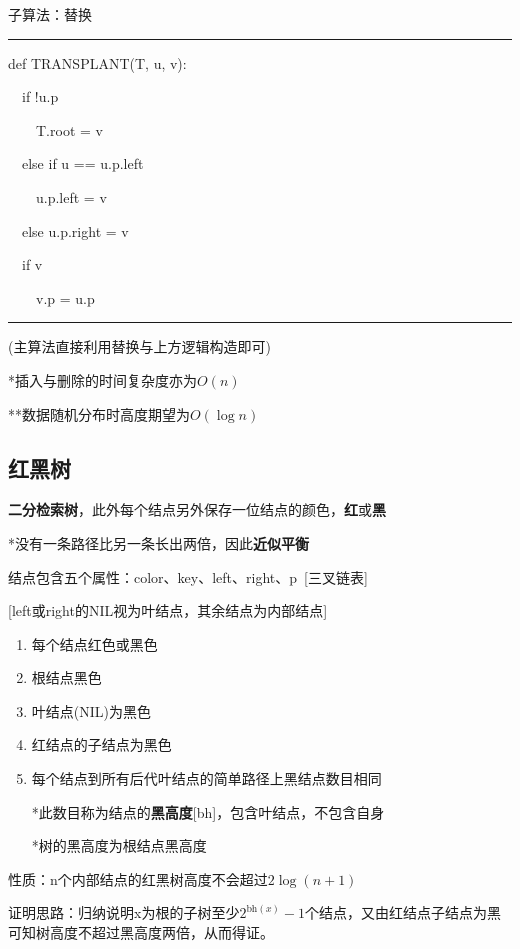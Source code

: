 \documentclass[a4paper,UTF8,fontset=windows]{ctexart}
\newenvironment{code}{\rule{36em}{0.1em}\setlength{\parindent}{1em}

}{

\setlength{\parindent}{0em}\rule{36em}{0.1em}}
\begin{document}
子算法：替换

\begin{code}
def TRANSPLANT(T, u, v):

\ \ if !u.p

\ \ \ \ T.root = v

\ \ else if u == u.p.left

\ \ \ \ u.p.left = v

\ \ else u.p.right = v

\ \ if v

\ \ \ \ v.p = u.p
\end{code}

(主算法直接利用替换与上方逻辑构造即可)

*\hspace{0em}插入与删除的时间复杂度亦为$O(n)$

**\hspace{0em}数据随机分布时高度期望为$O(\log n)$

\subsection{红黑树}

\textbf{二分检索树}，此外每个结点另外保存一位结点的颜色，\textbf{红}或\textbf{黑}

*\hspace{0em}没有一条路径比另一条长出两倍，因此\textbf{近似平衡}

结点包含五个属性：color、key、left、right、p\ [三叉链表]

[left或right的NIL视为叶结点，其余结点为内部结点]

\begin{enumerate}
    \item 每个结点红色或黑色
    \item 根结点黑色
    \item 叶结点(NIL)为黑色
    \item 红结点的子结点为黑色
    \item 每个结点到所有后代叶结点的简单路径上黑结点数目相同
    
    *\hspace{0em}此数目称为结点的\textbf{黑高度}[bh]，包含叶结点，不包含自身

    *\hspace{0em}树的黑高度为根结点黑高度
\end{enumerate}

性质：n个内部结点的红黑树高度不会超过$2\log(n+1)$

证明思路：归纳说明x为根的子树至少$2^{\mathrm{bh}(x)}-1$个结点，又由红结点子结点为黑可知树高度不超过黑高度两倍，从而得证。
\end{document}
